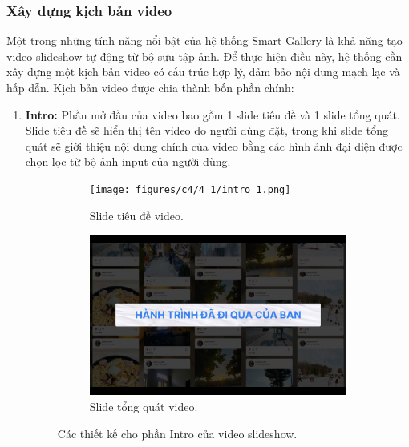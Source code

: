 \subsubsection{Xây dựng kịch bản video}

Một trong những tính năng nổi bật của hệ thống Smart Gallery là khả năng tạo video slideshow tự động từ bộ sưu tập ảnh. Để thực hiện điều này, hệ thống cần xây dựng một kịch bản video có cấu trúc hợp lý, đảm bảo nội dung mạch lạc và hấp dẫn. Kịch bản video được chia thành bốn phần chính:

\begin{enumerate}
    \item \textbf{Intro:}\newline
    Phần mở đầu của video bao gồm 1 slide tiêu đề và 1 slide tổng quát. Slide tiêu đề sẽ hiển thị tên video do người dùng đặt, trong khi slide tổng quát sẽ giới thiệu nội dung chính của video bằng các hình ảnh đại diện được chọn lọc từ bộ ảnh input của người dùng.
    
    \begin{figure}[H]
        \centering
        \begin{subfigure}{0.48\textwidth}
            \texttt{[image: figures/c4/4\_1/intro\_1.png]} 
            \caption{Slide tiêu đề video.}
        \end{subfigure}
        \hfill
        \begin{subfigure}{0.48\textwidth}
            \includegraphics[width=1\linewidth]{figures/c4/4_1/intro_2.jpg} 
            \caption{Slide tổng quát video.}
        \end{subfigure}
        \caption{Các thiết kế cho phần Intro của video slideshow.}
        \label{fig:video-intro-design}
    \end{figure}
    

\end{enumerate}

